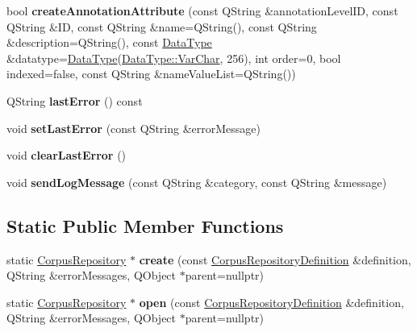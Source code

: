 \begin{DoxyCompactItemize}
\item 
\mbox{\label{class_corpus_repository_a715e6a5c85b900be84f44b77763d9688}} 
bool {\bfseries create\+Annotation\+Attribute} (const Q\+String \&annotation\+Level\+ID, const Q\+String \&ID, const Q\+String \&name=Q\+String(), const Q\+String \&description=Q\+String(), const \hyperlink{class_data_type}{Data\+Type} \&datatype=\hyperlink{class_data_type}{Data\+Type}(\hyperlink{class_data_type_a8df455d8d3949b604fbb2967dfeff239a160c768176611f2649889e252c756539}{Data\+Type\+::\+Var\+Char}, 256), int order=0, bool indexed=false, const Q\+String \&name\+Value\+List=Q\+String())
\item 
\mbox{\label{class_corpus_repository_ae5455da3eed599d6a36dc1f4b082e141}} 
Q\+String {\bfseries last\+Error} () const
\item 
\mbox{\label{class_corpus_repository_a60314b693ebcf37904be5d5b911dcdcf}} 
void {\bfseries set\+Last\+Error} (const Q\+String \&error\+Message)
\item 
\mbox{\label{class_corpus_repository_a05b094b05a99c5b9360a8a4e36b465e7}} 
void {\bfseries clear\+Last\+Error} ()
\item 
\mbox{\label{class_corpus_repository_a58ad4e9c09d31f9bfddcdaa833ffde6a}} 
void {\bfseries send\+Log\+Message} (const Q\+String \&category, const Q\+String \&message)
\end{DoxyCompactItemize}
\subsection*{Static Public Member Functions}
\begin{DoxyCompactItemize}
\item 
\mbox{\label{class_corpus_repository_a4306ac088c265f3d59f68c5357fcb078}} 
static \hyperlink{class_corpus_repository}{Corpus\+Repository} $\ast$ {\bfseries create} (const \hyperlink{class_corpus_repository_definition}{Corpus\+Repository\+Definition} \&definition, Q\+String \&error\+Messages, Q\+Object $\ast$parent=nullptr)
\item 
\mbox{\label{class_corpus_repository_affb2746157b21a8ef2cd1de89e762814}} 
static \hyperlink{class_corpus_repository}{Corpus\+Repository} $\ast$ {\bfseries open} (const \hyperlink{class_corpus_repository_definition}{Corpus\+Repository\+Definition} \&definition, Q\+String \&error\+Messages, Q\+Object $\ast$parent=nullptr)
\end{DoxyCompactItemize}


